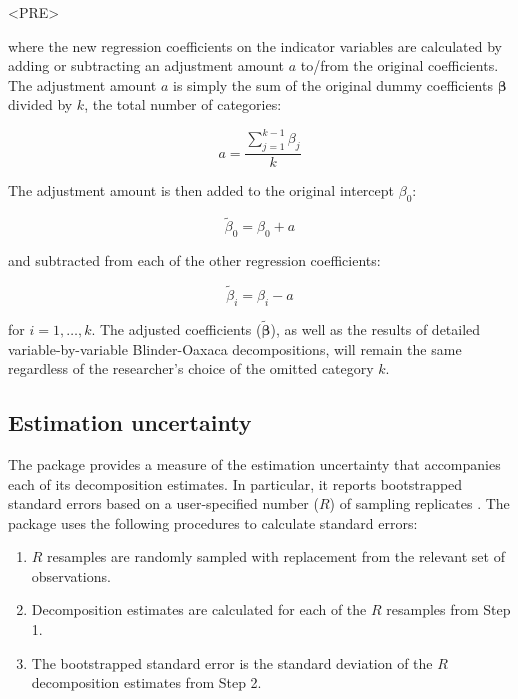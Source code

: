 <PRE>\documentclass[nojss]{jss}
\begin{document}
where the new regression coefficients on the indicator variables are calculated by adding or subtracting an adjustment amount $a$ to/from the original coefficients. The adjustment amount $a$ is simply the sum of the original dummy coefficients $\boldsymbol{\beta}$ divided by $k$, the total number of categories: 

\begin{equation}
a = \frac{\sum\limits_{j=1}^{k-1} \beta_{j}}{k}
\end{equation}

The adjustment amount is then added to the original intercept $\beta_{0}$:

\begin{equation}
\tilde{\beta}_{0} = \beta_{0} + a
\end{equation}

and subtracted from each of the other regression coefficients:

\begin{equation}
\tilde{\beta}_{i} = \beta_{i} - a
\end{equation}

for $i = 1, \dots, k$. The adjusted coefficients ($\boldsymbol{\tilde{\beta}}$), as well as the results of detailed variable-by-variable Blinder-Oaxaca decompositions, will remain the same regardless of the researcher's choice of the omitted category $k$.


\subsection[Estimation uncertainty]{Estimation uncertainty}

The  package provides a measure of the estimation uncertainty that accompanies each of its decomposition estimates. In particular, it reports bootstrapped standard errors based on a user-specified number ($R$) of sampling replicates \citep{Efron1979}. The package uses the following procedures to calculate standard errors:

\begin{enumerate}
\item $R$ resamples are randomly sampled with replacement from the relevant set of observations.
\item Decomposition estimates are calculated for each of the $R$ resamples from Step 1.
\item The bootstrapped standard error is the standard deviation of the $R$ decomposition estimates from Step 2.
\end{enumerate}
\end{document}
